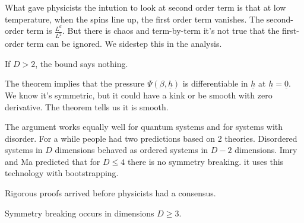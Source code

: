 What gave physicists the intution to look at second order term is that at low temperature, when the spins line up, the first order term vanishes. The second-order term is $\frac{L^d}{L^2}$. But there is chaos and term-by-term it's not true that the first-order term can be ignored. We sidestep this in the analysis.

If $D>2$, the bound says nothing.


The theorem implies that the pressure $\Psi(\beta, \underline{h})$ is differentiable in $\underline{h}$ at $\underline{h} = \underline{0}$. We know it's symmetric, but it could have a kink or be smooth with zero derivative. The theorem tells us it is smooth.

The argument works equally well for quantum systems and for systems with disorder. For a while people had two predictions based on 2 theories. Disordered systems in $D$ dimensions behaved as ordered systems in $D-2$ dimensions. Imry and Ma predicted that for $D\le 4$ there is no symmetry breaking. it uses this technology with bootstrapping.

Rigorous proofs arrived before physicists had a consensus.
%

Symmetry breaking occurs in dimensions $D\ge 3$. %

